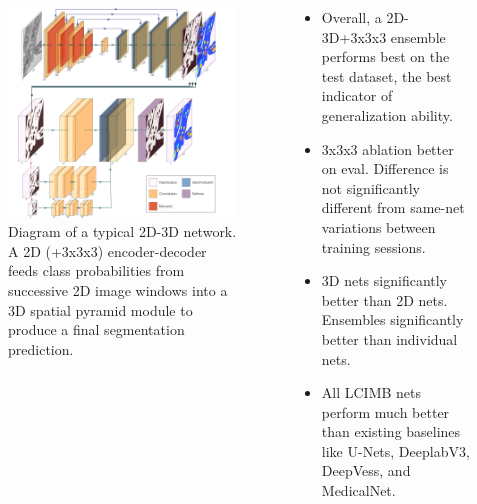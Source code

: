 \documentclass[final]{beamer}
\newlength{\onecolwid}
\newlength{\twocolwid}
\renewcommand{\emph}[1]{{\color{nibib2} #1}}
\begin{document}
\begin{frame}[t]
\begin{columns}[t]
\begin{column}{\twocolwid}
\begin{columns}[t]
\begin{column}{\onecolwid}
\begin{tcolorbox}[title=Methods]
\begin{itemize}
            \end{itemize}
        \end{tcolorbox}
    \begin{center}
        \begin{figure}
        \includegraphics[width=\linewidth]{fig/fullnet-rearranged.png}
        \caption{Diagram of a typical 2D-3D network. A 2D (+3x3x3) encoder-decoder feeds class probabilities from successive 2D image windows into a 3D spatial pyramid module to produce a final segmentation prediction.}
        \end{figure}
    \end{center}
    \end{column}
    \begin{column}{\onecolwid}
    	\begin{tcolorbox}[title=Results]
    	\begin{itemize}
    	\item Overall, a \emph{2D-3D+3x3x3} ensemble performs best on the test dataset, the best indicator of generalization ability. 
    	\item 3x3x3 ablation better on eval. Difference is not significantly different from same-net variations between training sessions.
    	\item 3D nets significantly better than 2D nets. Ensembles significantly better than individual nets.
    	\item All LCIMB nets perform much better than existing baselines like U-Nets, DeeplabV3, DeepVess, and MedicalNet.
    	\end{itemize}
    	\end{tcolorbox}
    	

\end{column}
\end{columns}
\end{column}
\end{columns}
\end{frame}
\end{document}
